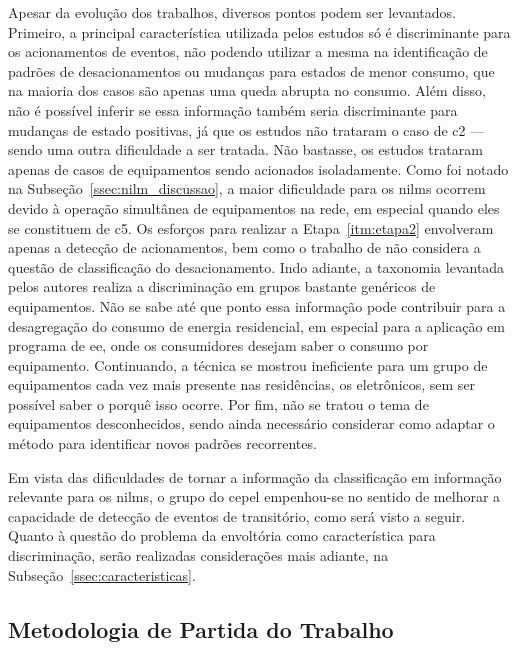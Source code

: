 Apesar da evolução dos trabalhos, diversos pontos podem ser
levantados. Primeiro, a principal característica utilizada pelos
estudos só é discriminante para os acionamentos de eventos, não
podendo utilizar a mesma na identificação de padrões de desacionamentos
ou mudanças para estados de menor consumo, que na maioria dos casos
são apenas uma queda abrupta no consumo.  Além disso, não é possível
inferir se essa informação também seria discriminante para mudanças de
estado positivas, já que os estudos não trataram o caso de \gls{c2}
--- sendo uma outra dificuldade a ser tratada. Não bastasse, os
estudos trataram apenas de casos de equipamentos sendo acionados
isoladamente. Como foi notado na Subseção~\ref{ssec:nilm_discussao},
a maior dificuldade para os \glspl{nilm} ocorrem devido à
operação simultânea de equipamentos na rede, em especial quando eles
se constituem de \gls{c5}. Os esforços para realizar a
Etapa~\ref{itm:etapa2} envolveram apenas a detecção de acionamentos,
bem como o trabalho de \cite{nilm_cepel_alvaro} não considera a
questão de classificação do desacionamento. Indo adiante, a taxonomia
levantada pelos autores realiza a discriminação em grupos bastante
genéricos de equipamentos.  Não se sabe até que ponto essa informação
pode contribuir para a desagregação do consumo de energia residencial,
em especial para a aplicação em programa de \gls{ee}, onde os
consumidores desejam saber o consumo por equipamento. Continuando, a
técnica se mostrou ineficiente para um grupo de equipamentos cada vez
mais presente nas residências, os eletrônicos, sem ser possível saber
o porquê isso ocorre. Por fim, não se tratou o tema de equipamentos
desconhecidos, sendo ainda necessário considerar como adaptar o método
para identificar novos padrões recorrentes.

Em vista das dificuldades de tornar a informação da classificação em
informação relevante para os \glspl{nilm}, o grupo do \gls{cepel}
empenhou-se no sentido de melhorar a capacidade de detecção de eventos
de transitório, como será visto a seguir. Quanto à questão do
problema da envoltória como característica para discriminação, serão
realizadas considerações mais adiante, na
Subseção~\ref{ssec:caracteristicas}.

\subsection{Metodologia de Partida do Trabalho}
\label{ssec:met_cepel}

